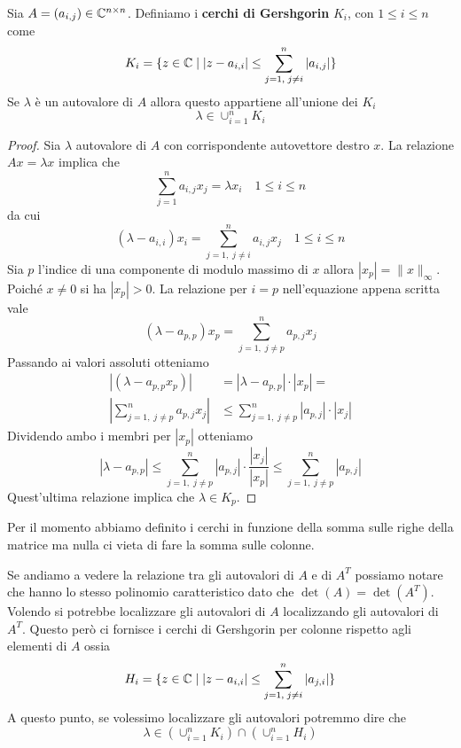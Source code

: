 \begin{theorem}[Gershgorin]
	Sia $A = (a_{i,j}) \in \mathbb{C}^{n \times n}$. Definiamo i \textbf{cerchi di Gershgorin} $K_i$, con $1 \leq i \leq n$
	come
	\[ K_i = \{ z \in \mathbb{C} \mid |z - a_{i,i}| \leq \sum_{j=1,\;j \neq i}^n |a_{i,j}| \} \]
	Se $\lambda$ è un autovalore di $A$ allora questo appartiene all'unione dei $K_i$
	\[ \lambda \in \cup_{i=1}^n K_i \]
	\begin{proof}
		Sia $\lambda$ autovalore di $A$ con corrispondente autovettore destro $x$. La relazione $A x = \lambda x$
		implica che
		\[ \sum_{j=1}^n a_{i,j} x_j = \lambda x_i \quad 1 \leq i \leq n \]
		da cui
		\[ (\lambda - a_{i,i}) x_i = \sum_{j=1,\; j \neq i}^n a_{i,j} x_j \quad 1 \leq i \leq n \]
		Sia $p$ l'indice di una componente di modulo massimo di $x$ allora $|x_p| = \| x \|_\infty$. Poiché
		$x \neq 0$ si ha $|x_p| > 0$. La relazione per $i = p$ nell'equazione appena scritta vale
		\[ (\lambda - a_{p,p}) x_p = \sum_{j=1,\; j \neq p}^n a_{p,j} x_j \]
		Passando ai valori assoluti otteniamo
		\begin{align*}
			|(\lambda - a_{p,p} x_p)|                           &
			= |\lambda - a_{p,p}| \cdot |x_p| =                   \\
			\left| \sum_{j=1,\; j \neq p}^n a_{p,j} x_j \right| &
			\leq \sum_{j=1,\; j \neq p}^n |a_{p,j}| \cdot |x_j|
		\end{align*}
		Dividendo ambo i membri per $|x_p|$ otteniamo
		\[
			|\lambda - a_{p,p}| \leq
			\sum_{j=1,\; j \neq p}^n |a_{p,j}| \cdot \frac{|x_j|}{|x_p|} \leq
			\sum_{j=1,\; j \neq p}^n |a_{p,j}|
		\]
		Quest'ultima relazione implica che $\lambda \in K_p$.
	\end{proof}
\end{theorem}

Per il momento abbiamo definito i cerchi in funzione della somma sulle righe della matrice ma nulla ci vieta di
fare la somma sulle colonne.

Se andiamo a vedere la relazione tra gli autovalori di $A$ e di $A^T$ possiamo notare che hanno lo stesso
polinomio caratteristico dato che $\det(A) = \det(A^T)$. Volendo si potrebbe localizzare gli autovalori di $A$
localizzando gli autovalori di $A^T$. Questo però ci fornisce i cerchi di Gershgorin per colonne rispetto agli
elementi di $A$ ossia
\[ H_i = \{ z \in \mathbb{C} \mid |z - a_{i,i}| \leq \sum_{j=1,\;j\neq i}^n |a_{j,i}| \} \]
A questo punto, se volessimo localizzare gli autovalori potremmo dire che
\[ \lambda \in \left( \cup_{i=1}^n K_i \right) \cap \left( \cup_{i=1}^n H_i \right) \]